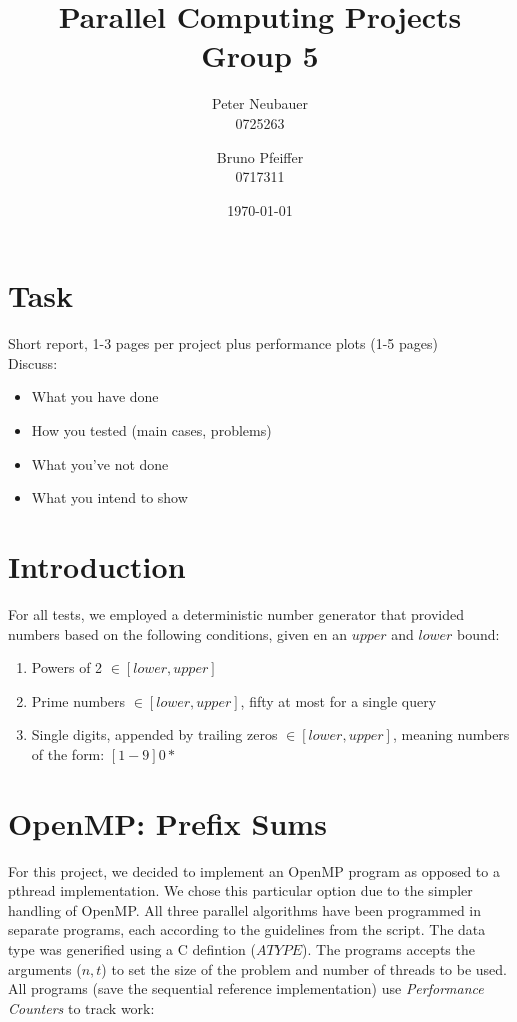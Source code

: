 \documentclass[11pt]{article}
\begin{document}
\title{Parallel Computing Projects\\ Group 5}
\author{Peter Neubauer\\ 0725263 \and Bruno Pfeiffer \\ 0717311}
\date{\today}
\maketitle
\newpage
\tableofcontents

\newpage

\section{Task}
Short report, 1-3 pages per project plus performance plots (1-5 pages)\\
Discuss:
\begin{itemize}
\item What you have done
\item How you tested (main cases, problems)
\item What you've not done
\item What you intend to show
\end{itemize}

\section{Introduction}


For all tests, we employed a deterministic number generator that provided numbers based on the following conditions, given en an $upper$ and $lower$ bound:

\begin{enumerate}
\item Powers of 2 $ \in [lower, upper]$
\item Prime numbers $\in [lower, upper]$, fifty at most for a single query
\item Single digits, appended by trailing zeros $\in [lower, upper]$, meaning numbers of the form: $[1-9]0*$
\end{enumerate}



\section{OpenMP: Prefix Sums}
For this project, we decided to implement an OpenMP program as opposed to a pthread implementation. We chose this particular option due to the simpler handling of OpenMP. All three parallel algorithms have been programmed in separate programs, each according to the guidelines from the script. The data type was generified using a C defintion ($ATYPE$). The programs accepts the arguments ($n, t$) to set the size of the problem and number of threads to be used.
All programs (save the sequential reference implementation) use \emph{Performance Counters} to track work:
\end{document}
